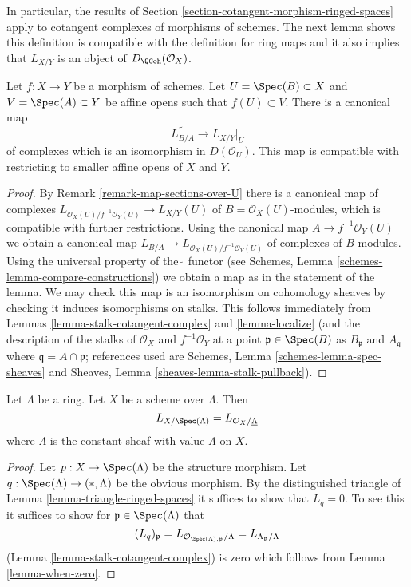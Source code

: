 \noindent
In particular, the results of
Section \ref{section-cotangent-morphism-ringed-spaces} apply
to cotangent complexes of morphisms of schemes.
The next lemma shows this definition is compatible with the definition
for ring maps and it also implies that $L_{X/Y}$ is an
object of $D_\QCoh(\mathcal{O}_X)$.

\begin{lemma}
\label{lemma-morphism-affine-schemes}
Let $f : X \to Y$ be a morphism of schemes. Let $U = \Spec(B) \subset X$
and $V = \Spec(A) \subset Y$ be affine opens such that $f(U) \subset V$.
There is a canonical map
$$
\widetilde{L_{B/A}} \longrightarrow L_{X/Y}|_U
$$
of complexes which is an isomorphism in $D(\mathcal{O}_U)$.
This map is compatible with restricting to smaller affine opens
of $X$ and $Y$.
\end{lemma}

\begin{proof}
By Remark \ref{remark-map-sections-over-U}
there is a canonical map of complexes
$L_{\mathcal{O}_X(U)/f^{-1}\mathcal{O}_Y(U)} \to L_{X/Y}(U)$
of $B = \mathcal{O}_X(U)$-modules, which is compatible
with further restrictions. Using the canonical map
$A \to f^{-1}\mathcal{O}_Y(U)$ we obtain a canonical map
$L_{B/A} \to L_{\mathcal{O}_X(U)/f^{-1}\mathcal{O}_Y(U)}$
of complexes of $B$-modules.
Using the universal property of the $\widetilde{\ }$
functor (see Schemes, Lemma \ref{schemes-lemma-compare-constructions})
we obtain a map as in the statement of the lemma.
We may check this map is an isomorphism on cohomology sheaves
by checking it induces isomorphisms on stalks.
This follows immediately from
Lemmas \ref{lemma-stalk-cotangent-complex} and \ref{lemma-localize}
(and the description of the stalks of
$\mathcal{O}_X$ and $f^{-1}\mathcal{O}_Y$
at a point $\mathfrak p \in \Spec(B)$ as $B_\mathfrak p$ and
$A_\mathfrak q$ where $\mathfrak q = A \cap \mathfrak p$; references
used are Schemes, Lemma \ref{schemes-lemma-spec-sheaves}
and
Sheaves, Lemma \ref{sheaves-lemma-stalk-pullback}).
\end{proof}

\begin{lemma}
\label{lemma-scheme-over-ring}
Let $\Lambda$ be a ring. Let $X$ be a scheme over $\Lambda$.
Then
$$
L_{X/\Spec(\Lambda)} = L_{\mathcal{O}_X/\underline{\Lambda}}
$$
where $\underline{\Lambda}$ is the constant sheaf with value
$\Lambda$ on $X$.
\end{lemma}

\begin{proof}
Let $p : X \to \Spec(\Lambda)$ be the structure morphism.
Let $q : \Spec(\Lambda) \to (*, \Lambda)$ be the obvious morphism.
By the distinguished triangle of Lemma \ref{lemma-triangle-ringed-spaces}
it suffices to show that $L_q = 0$. To see this it suffices to
show for $\mathfrak p \in \Spec(\Lambda)$ that
$$
(L_q)_\mathfrak p =
L_{\mathcal{O}_{\Spec(\Lambda), \mathfrak p}/\Lambda} =
L_{\Lambda_\mathfrak p/\Lambda}
$$
(Lemma \ref{lemma-stalk-cotangent-complex})
is zero which follows from Lemma \ref{lemma-when-zero}.
\end{proof}






